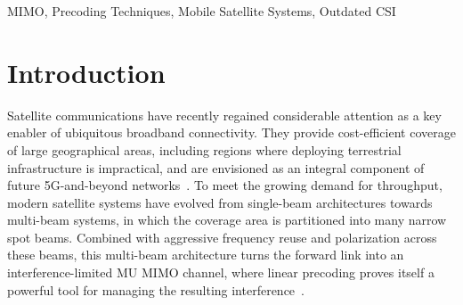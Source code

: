 \documentclass[conference]{IEEEtran}
\begin{document}
\maketitle

\begin{abstract}
Linear precoding has become a cornerstone of \acs*{MIMO} communications, as it enables spatial multiplexing gains that translate directly into higher spectral efficiency.
These benefits are particularly valuable in multi-beam high-throughput satellite systems, where aggressive frequency reuse across the narrow spot beams turns the forward link into an interference-limited \acs*{MU}-\acs*{MIMO} channel. 
In this environment, precoding is crucial for mitigating inter-beam interference.
In mobile satellite scenarios, however, the combination of long propagation delays and time-varying channels induced by user mobility introduces complications.
More specific, the \acs*{CSI} available during the precoder computation is systematically outdated with respect to the channel experienced at the time of transmission.
This work quantifies the impact of the \acs*{CSI} feedback delay on the system performance, revealing a substantial performance loss.
To counter this degradation, a low-complexity prediction strategy is proposed.
Numerical results show that this scheme recovers a significant fraction of the performance loss under the considered channel model.
\end{abstract}

\begin{IEEEkeywords}
\acs*{MIMO}, Precoding Techniques, Mobile Satellite Systems, Outdated \acs*{CSI}
\end{IEEEkeywords}

\section{Introduction}
\label{section:introduction}

Satellite communications have recently regained considerable attention as a key enabler of ubiquitous broadband connectivity. 
They provide cost-efficient coverage of large geographical areas, including regions where deploying terrestrial infrastructure is impractical, and are envisioned as an integral component of future 5G-and-beyond networks~\cite{signal_processing_for_hts, satellites_in_new_space_era}.
To meet the growing demand for throughput, modern satellite systems have evolved from single-beam architectures towards multi-beam systems, in which the coverage area is partitioned into many narrow spot beams.
Combined with aggressive frequency reuse and polarization across these beams, this multi-beam architecture turns the forward link into an interference-limited \ac{MU} \ac{MIMO} channel, where linear precoding proves itself a powerful tool for managing the resulting interference~\cite{precoding_for_satellites_survey}.
\end{document}
